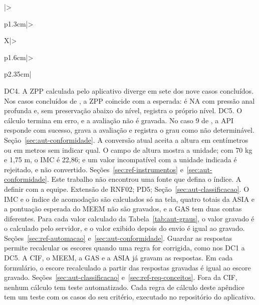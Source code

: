 \begin{apendicesenv}
{\begin{xltabular}{\textwidth}{|>{\raggedright\arraybackslash}p{1.3cm}|>{\raggedright\arraybackslash}X|>{\raggedright\arraybackslash}p{1.6cm}|>{\raggedright\arraybackslash}p{2.35cm}|}
		{DC4.}
		{A ZPP calculada pelo aplicativo diverge em sete dos nove casos concluídos.}
		{Nos casos concluídos de , a ZPP coincide com a esperada: é NA com pressão anal
		profunda e, sem preservação abaixo do nível, registra o próprio nível.}
		{DC5.}
		{O cálculo termina em erro, e a avaliação não é gravada.}
		{No caso 9 de , a API responde com sucesso, grava a avaliação e registra o grau
		como não determinável.}
		{Seção~\ref{sec:aut-conformidade}.}
		{A conversão atual aceita a altura em centímetros ou em metros sem indicar qual.}
		{O campo de altura mostra a unidade; com 70 kg e 1,75 m, o IMC é 22,86; e um valor incompatível com a
		unidade indicada é rejeitado, e não convertido.}
		{Seções~\ref{sec:ref-instrumentos} e~\ref{sec:aut-conformidade}.}
		{Este trabalho não encontrou uma fonte que defina o índice.}
		{A definir com a equipe.}
		{Extensão de RNF02; PD5; Seção~\ref{sec:aut-classificacao}.}
		{O IMC e o índice de acomodação são calculados só na tela, quatro totais da ASIA e a pontuação esperada do MEEM
		não são gravados, e a GAS tem duas contas diferentes.}
		{Para cada valor calculado da Tabela~\ref{tab:aut-graus}, o valor gravado é o calculado pelo servidor, e
		o valor exibido depois do envio é igual ao gravado.}
		{Seções~\ref{sec:ref-automacao} e~\ref{sec:aut-conformidade}.}
		{Guardar as respostas permite recalcular os escores quando uma regra for corrigida, como nos DC1 a DC5. A CIF,
		o MEEM, a GAS e a ASIA já gravam as respostas.}
		{Em cada formulário, o escore recalculado a partir das respostas gravadas é igual ao escore gravado.}
		{Seções~\ref{sec:aut-classificacao} e~\ref{sec:ref-req-conceitos}.}
		{Fora da CIF, nenhum cálculo tem teste automatizado.}
		{Cada regra de cálculo deste apêndice tem um teste com os casos do seu critério, executado no repositório do
		aplicativo.}


\end{xltabular}}
\end{apendicesenv}
